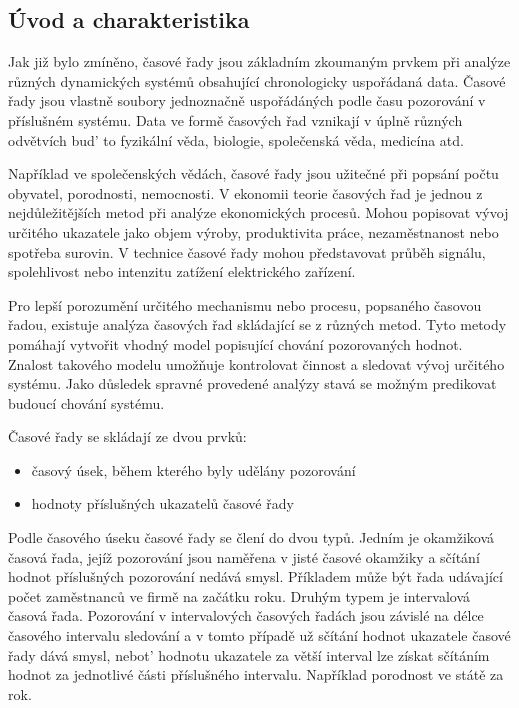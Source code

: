 \documentclass[a4paper,12pt,twoside]{scrreprt}
\begin{document}
\subsection{Úvod a charakteristika}
Jak již bylo zmíněno, časové řady jsou základním zkoumaným prvkem při analýze různých dynamických systémů obsahující chronologicky uspořádaná data. Časové řady jsou vlastně soubory jednoznačně uspořádáných podle času pozorování v příslušném systému. Data ve formě časových řad vznikají v úplně různých odvětvích bud' to fyzikální věda, biologie, společenská věda, medicína atd. 

Například ve společenských vědách, časové řady jsou užitečné při popsání počtu obyvatel, porodnosti, nemocnosti. V ekonomii teorie časových řad je jednou z nejdůležitějších metod při analýze ekonomických procesů. Mohou popisovat vývoj určitého ukazatele jako objem výroby, produktivita práce, nezaměstnanost nebo spotřeba surovin. V technice časové řady mohou představovat průběh signálu, spolehlivost nebo intenzitu zatížení elektrického zařízení. 

Pro lepší porozumění určitého mechanismu nebo procesu, popsaného časovou řadou, existuje analýza časových řad skládající se z různých metod. Tyto metody pomáhají vytvořit vhodný model popisující chování pozorovaných hodnot. Znalost takového modelu umožňuje kontrolovat činnost a sledovat vývoj určitého systému. Jako důsledek spravné provedené analýzy stavá se možným predikovat budoucí chování systému.

Časové řady se skládají ze dvou prvků:
\begin{itemize}
\item časový úsek, během kterého byly udělány pozorování
\item hodnoty příslušných ukazatelů časové řady
\end{itemize}

Podle časového úseku časové řady se člení do dvou typů. Jedním je okamžiková časová řada, jejíž pozorování jsou naměřena v jisté časové okamžiky a sčítání hodnot příslušných pozorování nedává smysl. Příkladem může být řada udávající počet zaměstnanců ve firmě na začátku roku. Druhým typem je intervalová časová řada. Pozorování v intervalových časových řadách jsou závislé na délce časového intervalu sledování a v tomto případě už sčítání hodnot ukazatele časové řady dává smysl, nebot' hodnotu ukazatele za větší interval lze získat sčítáním hodnot za jednotlivé části příslušného intervalu. Například porodnost ve státě za rok. 
\end{document}

